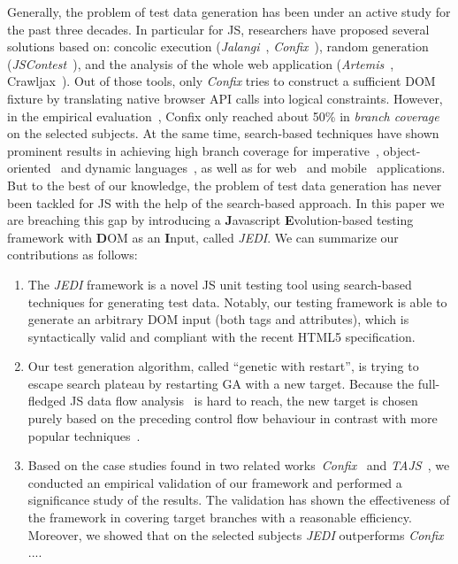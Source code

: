 \documentclass[sigconf,review]{acmart}
\begin{document}
Generally, the problem of test data generation has been under an active study for the past three decades. In particular for JS, researchers have proposed several solutions based on: concolic execution (\emph{Jalangi}~\cite{sen2013jalangi}, \emph{Confix}~\cite{amin:ase15}), random generation (\emph{JSContest}~\cite{heidegger2010contract}), and the analysis of the whole web application (\emph{Artemis}~\cite{artemis2011}, Crawljax~\cite{mesbah2012crawling}). Out of those tools, only \emph{Confix} tries to construct a sufficient DOM fixture by translating native browser API calls into logical constraints. However, in the empirical evaluation~\cite{amin:ase15}, Confix only reached about 50\% in \emph{branch coverage} on the selected subjects. At the same time, search-based techniques have shown prominent results in achieving high branch coverage for imperative~\cite{wegener2001evolutionary}, object-oriented~\cite{fraser2011evosuite} and dynamic languages~\cite{irawan2016test, wibowo2015unit}, as well as for web~\cite{alshahwan2011automated} and mobile~\cite{mao2016sapienz} applications. But to the best of our knowledge, the problem of test data generation has never been tackled for JS with the help of the search-based approach. In this paper we are breaching this gap by introducing a \textbf{J}avascript \textbf{E}volution-based testing framework with \textbf{D}OM as an \textbf{I}nput, called \emph{JEDI}. We can summarize our contributions as follows: 
\begin{enumerate}[leftmargin=5mm]
\item The \emph{JEDI} framework is a novel JS unit testing tool using search-based techniques for generating test data. Notably, our testing framework is able to generate an arbitrary DOM input (both tags and attributes), which is syntactically valid and compliant with the recent HTML5 specification.   
\item Our test generation algorithm, called ``genetic with restart'', is trying to escape search plateau by restarting GA with a new target. Because the full-fledged JS data flow analysis~\cite{jang2009points} is hard to reach, the new target is chosen purely based on the preceding control flow behaviour in contrast with more popular techniques~\cite{ferguson1996chaining}.  
\item Based on the case studies found in two related works~\emph{Confix}~\cite{amin:ase15} and \emph{TAJS}~\cite{dom2011}, we conducted an empirical validation of our framework and performed a significance study of the results. The validation has shown the effectiveness of the framework in covering target branches with a reasonable efficiency. Moreover, we showed that on the selected subjects \emph{JEDI} outperforms \emph{Confix} ....  
\end{enumerate} 
\end{document}

